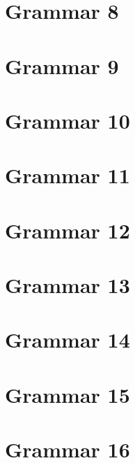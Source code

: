 \section{Grammar 8}


\section{Grammar 9}


\section{Grammar 10}


\section{Grammar 11}


\section{Grammar 12}


\section{Grammar 13}


{
	\def\parsingTablesFontSize{\tiny}
	\section{Grammar 14}
	
}

\section{Grammar 15}


\section{Grammar 16}


